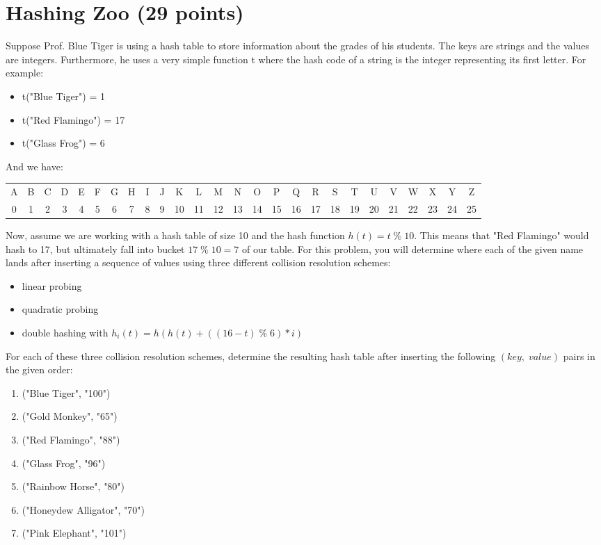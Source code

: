 \documentclass[11pt]{exam}
\begin{document}
\section{Hashing Zoo (29 points)}
Suppose Prof. Blue Tiger is using a hash table to store information about the grades of his students. The keys are strings and the values are integers. Furthermore, he uses a very simple function t where the hash code of a string is the integer representing its first letter. For example:
\begin{itemize}
\item t("Blue Tiger") = 1
\item t("Red Flamingo") = 17
\item t("Glass Frog") = 6
\end{itemize}

And we have:
\begin{table}[H]
\centering
\setlength{\tabcolsep}{1mm}
\begin{tabular}{cccccccccccccccccccccccccc}
A&B&C&D&E&F&G&H&I&J&K&L&M&N&O&P&Q&R&S&T&U&V&W&X&Y&Z\\
0&1&2&3&4&5&6&7&8&9&10&11&12&13&14&15&16&17&18&19&20&21&22&23&24&25
\end{tabular}
\end{table}
Now, assume we are working with a hash table of size 10 and the hash function $h(t) = t \;\%\; 10$. This means that "Red Flamingo" would hash to 17, but ultimately fall into bucket $17 \;\%\; 10 = 7$ of our table. For this problem, you will determine where each of the given name lands after inserting a sequence of values using three different collision resolution schemes:

\begin{itemize}
\item linear probing
\item quadratic probing
\item double hashing with $h_i(t) = h(h(t)+((16-t)\;\%\; 6) * i)$
\end{itemize}

For each of these three collision resolution schemes, determine the resulting hash table after inserting the following $(key,\;value)$ pairs in the given order:
\begin{enumerate}[1.]
\item ("Blue Tiger", "100")
\item ("Gold Monkey", "65")
\item ("Red Flamingo", "88")
\item ("Glass Frog", "96")
\item ("Rainbow Horse", "80")
\item ("Honeydew Alligator", "70")
\item ("Pink Elephant", "101")

\end{enumerate}
\end{document}
